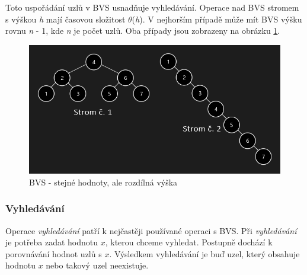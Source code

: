 \documentclass[
  biblatex=false,
  font=serif,
  glossaries=false,
  tables=false,
  theorems=false,
  index
]{kidiplom}
\begin{document}
\noindent Toto uspořádání uzlů v BVS usnadňuje vyhledávání. Operace nad BVS stromem s výškou \textit{h}  mají časovou složitost $ \theta$(\textit{h}). V nejhorším případě může mít BVS výšku rovnu \textit{n} - 1, kde \textit{n} je počet uzlů. Oba případy jsou zobrazeny na obrázku \ref{binary}.

\begin{figure}[h!]
\centering
	\includegraphics[scale=0.7]{obrazky/4BinarniVyhledavaciStrom.png}
	\caption{BVS - stejné hodnoty, ale rozdílná výška }
	\label{binary}
\end{figure}

\subsubsection{Vyhledávání}
\indent\indent Operace \textit{vyhledávání} patří k nejčastěji používané operaci s BVS. Při \textit{vyhledávání} je potřeba zadat hodnotu $x$, kterou chceme vyhledat. Postupně dochází k porovnávání hodnot uzlů s $x$. Výsledkem vyhledávání je buď uzel, který obsahuje hodnotu $x$ nebo takový uzel neexistuje.\\
\end{document}
